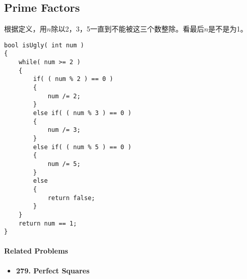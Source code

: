 \subsection{Prime Factors}
根据定义，用$n$除以2，3，5一直到不能被这三个数整除。看最后$n$是不是为1。
\setcounter{lstlisting}{0}
\begin{lstlisting}[style=customc, caption={Divide}]
bool isUgly( int num )
{
    while( num >= 2 )
    {
        if( ( num % 2 ) == 0 )
        {
            num /= 2;
        }
        else if( ( num % 3 ) == 0 )
        {
            num /= 3;
        }
        else if( ( num % 5 ) == 0 )
        {
            num /= 5;
        }
        else
        {
            return false;
        }
    }
    return num == 1;
}
\end{lstlisting}

\paragraph{Related Problems}
\begin{itemize}
\item \textbf{279. Perfect Squares}

\end{itemize}